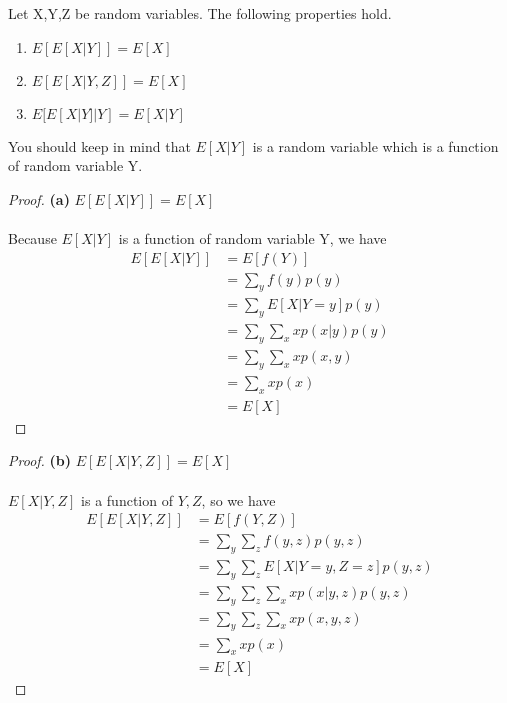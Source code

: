 \begin{enumerate}
\begin{lemma}{Let X,Y,Z be random variables. The following properties hold.}
\begin{enumerate}
			      \item
			            $E[E[X|Y]]=E[X]$
			      \item
			            $E[E[X|Y,Z]]=E[X]$
			      \item
			            $E[E[X|Y]|Y]=E[X|Y]$

		      \end{enumerate}

	      \end{lemma}
	      You should keep in mind that $E[X|Y]$ is a random variable which is a function of random variable Y.
	      \begin{proof}{\textbf{(a)} $E[E[X|Y]]=E[X]$}
		      \\ \\Because $E[X|Y]$ is a function of random variable Y, we have
		      \begin{align*}
			      E[E[X|Y]] & = E[f(Y)]                     \\
			                & = \sum_{y}f(y)p(y)            \\
			                & = \sum_{y}E[X|Y=y]p(y)        \\
			                & = \sum_{y}\sum_{x}xp(x|y)p(y) \\
			                & = \sum_{y}\sum_{x}xp(x,y)     \\
			                & = \sum_{x}xp(x)               \\
			                & = E[X]
		      \end{align*}
	      \end{proof}
	      \begin{proof}{\textbf{(b)} $E[E[X|Y,Z]]=E[X]$}
		      \\ \\$E[X|Y,Z]$ is a function of $Y,Z$, so we have
			      \begin{align*}
				      E[E[X|Y,Z]] & = E[f(Y,Z)]                               \\
				                  & = \sum_{y}\sum_{z}f(y,z)p(y,z)            \\
				                  & = \sum_{y}\sum_{z}E[X|Y=y,Z=z]p(y,z)      \\
				                  & = \sum_{y}\sum_{z}\sum_{x}xp(x|y,z)p(y,z) \\
				                  & = \sum_{y}\sum_{z}\sum_{x}xp(x,y,z)       \\
				                  & = \sum_{x}xp(x)                           \\
				                  & = E[X]
			      \end{align*}

\end{proof}
\end{enumerate}
